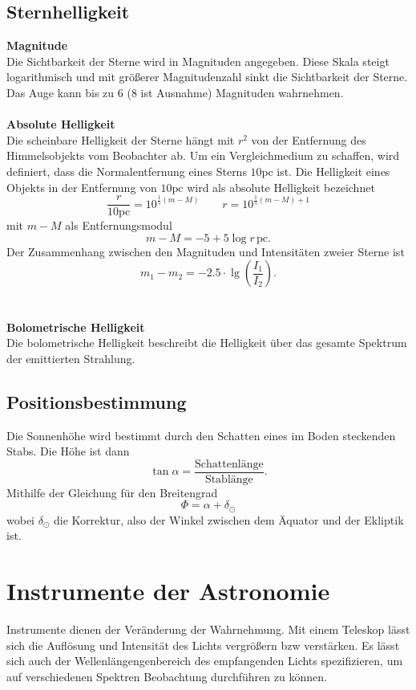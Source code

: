 \documentclass[a4paper,12pt]{article}
\begin{document}
\subsection{Sternhelligkeit}
\textbf{Magnitude}\\ 
Die Sichtbarkeit der Sterne wird in Magnituden angegeben. Diese Skala steigt logarithmisch und mit größerer Magnitudenzahl sinkt die Sichtbarkeit der Sterne. Das Auge kann bis zu 6 (8 ist Ausnahme) Magnituden wahrnehmen.
\\\hfill\\\textbf{Absolute Helligkeit}\\ 
Die scheinbare Helligkeit der Sterne hängt mit $r^2$ von der Entfernung des Himmelsobjekts vom Beobachter ab. Um ein Vergleichmedium zu schaffen, wird definiert, dass die Normalentfernung eines Sterns $10\text{pc}$ ist. Die Helligkeit eines Objekts in der Entfernung von $10\text{pc}$ wird als absolute Helligkeit bezeichnet
\[ 
        \dfrac{r}{10\text{pc}}=10^{\tfrac{1}{5}\left(m-M\right)}\qquad r=10^{\tfrac{1}{5}\left(m-M\right)+1}
\] 
mit $m-M$ als Entfernungsmodul
\[ 
        m-M=-5+5\log r\,\text{pc}
.\] 
Der Zusammenhang zwischen den Magnituden und Intensitäten zweier Sterne ist
\[ 
        m_1-m_2=-2.5\cdot \lg\left(\dfrac{I_1}{I_2}\right)
.\] 
\\\hfill\\\textbf{Bolometrische Helligkeit}\\ 
Die bolometrische Helligkeit beschreibt die Helligkeit über das gesamte Spektrum der emittierten Strahlung.

\subsection{Positionsbestimmung}
Die Sonnenhöhe wird bestimmt durch den Schatten eines im Boden steckenden Stabs. Die Höhe ist dann
\[
        \tan \alpha =\dfrac{\text{Schattenlänge}}{\text{Stablänge}}
.\]
Mithilfe der Gleichung für den Breitengrad 
\[ 
        \Phi =\alpha +\delta _{\odot}
\]
wobei $\delta _{\odot}$ die Korrektur, also der Winkel zwischen dem Äquator und der Ekliptik ist.

\section{Instrumente der Astronomie}
Instrumente dienen der Veränderung der Wahrnehmung. Mit einem Teleskop lässt sich die Auflösung und Intensität des Lichts vergrößern bzw verstärken. Es lässt sich auch der Wellenlängengenbereich des empfangenden Lichts spezifizieren, um auf verschiedenen Spektren Beobachtung durchführen zu können.
\end{document}
